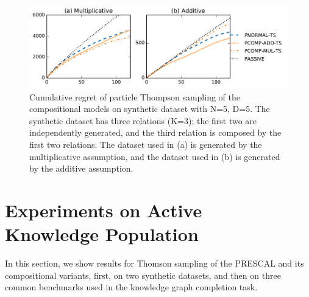 \begin{figure}[t]
	\centering
	\includegraphics[width=\linewidth]{images/toy_comp_5_2_5.pdf}
	\caption{\label{fig:comp_synthetic} Cumulative regret of particle Thompson sampling of the compositional models on synthetic dataset with N=5, D=5. The synthetic dataset has three relations (K=3); the first two are independently generated, and the third relation is composed by the first two relations. The dataset used in (a) is generated by the multiplicative assumption, and the dataset used in (b) is generated by the additive assumption.}
\end{figure}



\section{Experiments on Active \\ Knowledge Population}
\label{sec:exp2}

In this section, we show results for Thomson sampling of the PRESCAL and its compositional variants, first, on two synthetic datasets, and then on three common benchmarks used in the knowledge graph completion task.

